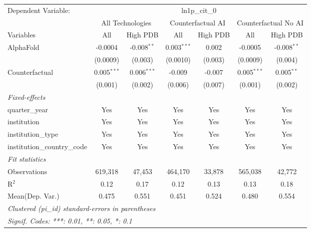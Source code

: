 \begingroup
\centering
\begin{tabular}{lcccccc}
   \tabularnewline \midrule \midrule
   Dependent Variable: & \multicolumn{6}{c}{ln1p\_cit\_0}\\
 & \multicolumn{2}{c}{All Technologies} & \multicolumn{2}{c}{Counterfactual AI} & \multicolumn{2}{c}{Counterfactual No AI} \\
\cmidrule(lr){1-1}\cmidrule(lr){2-3} \cmidrule(lr){4-5} \cmidrule(lr){6-7}
Variables & \multicolumn{1}{c}{All} & \multicolumn{1}{c}{High PDB} & \multicolumn{1}{c}{All} & \multicolumn{1}{c}{High PDB} & \multicolumn{1}{c}{All} & \multicolumn{1}{c}{High PDB} \\
\cmidrule(lr){1-1}\cmidrule(lr){2-2} \cmidrule(lr){3-3} \cmidrule(lr){4-4} \cmidrule(lr){5-5} \cmidrule(lr){6-6} \cmidrule(lr){7-7}
   AlphaFold                    & -0.0004       & -0.008$^{**}$ & 0.003$^{***}$ & 0.002   & -0.0005       & -0.008$^{**}$\\   
                                & (0.0009)      & (0.003)       & (0.0010)      & (0.003) & (0.0009)      & (0.004)\\   
   Counterfactual               & 0.005$^{***}$ & 0.006$^{***}$ & -0.009        & -0.007  & 0.005$^{***}$ & 0.005$^{**}$\\   
                                & (0.001)       & (0.002)       & (0.006)       & (0.007) & (0.001)       & (0.002)\\   
   \midrule
   \emph{Fixed-effects}\\
   quarter\_year                & Yes           & Yes           & Yes           & Yes     & Yes           & Yes\\  
   institution                  & Yes           & Yes           & Yes           & Yes     & Yes           & Yes\\  
   institution\_type            & Yes           & Yes           & Yes           & Yes     & Yes           & Yes\\  
   institution\_country\_code   & Yes           & Yes           & Yes           & Yes     & Yes           & Yes\\  
   \midrule
   \emph{Fit statistics}\\
   Observations                 & 619,318       & 47,453        & 464,170       & 33,878  & 565,038       & 42,772\\  
   R$^2$                        & 0.12          & 0.17          & 0.12          & 0.13    & 0.13          & 0.18\\  
Mean(Dep. Var.) & 0.475 & 0.551 & 0.451 & 0.524 & 0.480 & 0.554 \\
   \midrule \midrule
   \multicolumn{7}{l}{\emph{Clustered (pi\_id) standard-errors in parentheses}}\\
   \multicolumn{7}{l}{\emph{Signif. Codes: ***: 0.01, **: 0.05, *: 0.1}}\\
\end{tabular}
\par\endgroup
